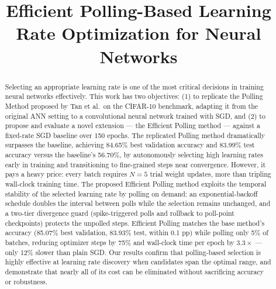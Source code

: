 \documentclass[conference]{IEEEtran}
\begin{document}
\title{Efficient Polling-Based Learning Rate Optimization for Neural Networks}

\author{
\and
{}
}

\maketitle

\begin{abstract}
Selecting an appropriate learning rate is one of the most critical decisions in training neural networks effectively. This work has two objectives: (1) to replicate the Polling Method proposed by Tan et al.\ on the CIFAR-10 benchmark, adapting it from the original ANN setting to a convolutional neural network trained with SGD, and (2) to propose and evaluate a novel extension --- the Efficient Polling method --- against a fixed-rate SGD baseline over 150 epochs. The replicated Polling method dramatically surpasses the baseline, achieving 84.65\% best validation accuracy and 83.99\% test accuracy versus the baseline's 56.70\%, by autonomously selecting high learning rates early in training and transitioning to fine-grained steps near convergence. However, it pays a heavy price: every batch requires $N=5$ trial weight updates, more than tripling wall-clock training time. The proposed Efficient Polling method exploits the temporal stability of the selected learning rate by polling on demand: an exponential-backoff schedule doubles the interval between polls while the selection remains unchanged, and a two-tier divergence guard (spike-triggered polls and rollback to poll-point checkpoints) protects the unpolled steps. Efficient Polling matches the base method's accuracy (85.07\% best validation, 83.93\% test, within 0.1 pp) while polling only 5\% of batches, reducing optimizer steps by 75\% and wall-clock time per epoch by $3.3\times$ --- only 12\% slower than plain SGD. Our results confirm that polling-based selection is highly effective at learning rate discovery when candidates span the optimal range, and demonstrate that nearly all of its cost can be eliminated without sacrificing accuracy or robustness.
\end{abstract}
\end{document}
